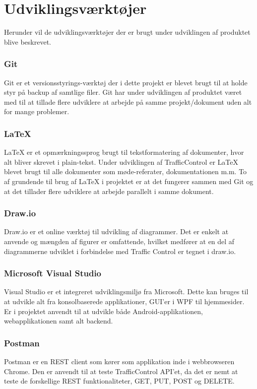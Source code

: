 \chapter{Udviklingsværktøjer}
Herunder vil de udviklingsværktøjer der er brugt under udviklingen af 
produktet blive beskrevet.

\subsection*{Git}
Git\cite{GitRef} er et versionsstyrings-værktøj der i dette projekt er 
blevet brugt til at holde styr på backup af samtlige filer. Git har under 
udviklingen af produktet været med til at tillade flere udviklere at 
arbejde på samme projekt/dokument uden alt for mange problemer.

\subsection*{\LaTeX}
\LaTeX \cite{LatexRef} er et opmærkningssprog brugt til tekstformatering af 
dokumenter, hvor alt bliver skrevet i plain-tekst. Under udviklingen af 
TrafficControl er LaTeX blevet brugt til alle dokumenter som 
møde-referater, dokumentationen m.m. To af grundende til brug af LaTeX i 
projektet er at det fungerer sammen med Git og at det tillader flere 
udviklere at arbejde parallelt i samme dokument.

\subsection*{Draw.io}
Draw.io\cite{Draw.io} er et online værktøj til udvikling af diagrammer. 
Det er enkelt at anvende og mængden af figurer er omfattende, hvilket medfører at en del af diagrammerne udviklet i forbindelse med Traffic Control er tegnet i draw.io.

\subsection*{Microsoft Visual Studio}
Visual Studio\cite{VisualStudio} er et integreret udviklingsmiljø fra 
Microsoft. Dette kan 	bruges til at udvikle alt fra konsolbaserede 
applikationer, GUI'er i WPF til hjemmesider. Er i projektet anvendt til at 
udvikle både Android-applikationen, webapplikationen samt alt backend.

\subsection*{Postman} 
Postman\cite{Postman} er en REST client som kører som applikation inde i 
webbrowseren Chrome. Den er anvendt til at teste TrafficControl API'et, da 
det er nemt at teste de forskellige REST funktionaliteter, GET, PUT, POST og 
DELETE.


